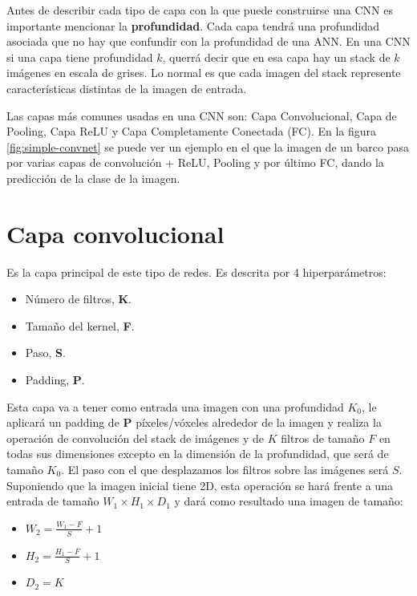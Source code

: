 Antes de describir cada tipo de capa con la que puede construirse una CNN es importante mencionar la \textbf{profundidad}. Cada capa tendrá una profundidad asociada que no hay que confundir con la profundidad de una ANN. En una CNN si una capa tiene profundidad $k$, querrá decir que en esa capa hay un stack de $k$ imágenes en escala de grises. Lo normal es que cada imagen del stack represente características distintas de la imagen de entrada.

Las capas más comunes usadas en una CNN son: Capa Convolucional, Capa de Pooling, Capa ReLU y Capa Completamente Conectada (FC). En la figura \ref{fig:simple-convnet} \cite{missinglink2020} se puede ver un ejemplo en el que la imagen de un barco pasa por varias capas de convolución + ReLU, Pooling y por último FC, dando la predicción de la clase de la imagen.


\newpage\section{Capa convolucional}

Es la capa principal de este tipo de redes. Es descrita por 4 hiperparámetros:

\begin{itemize}
\item Número de filtros, \textbf{K}.
\item Tamaño del kernel, \textbf{F}.
\item Paso, \textbf{S}.
\item Padding, \textbf{P}.
\end{itemize}

Esta capa va a tener como entrada una imagen con una profundidad $K_0$, le aplicará un padding de \textbf{P} píxeles/vóxeles alrededor de la imagen y realiza la operación de convolución del stack de imágenes y de $K$ filtros de tamaño $F$ en todas sus dimensiones excepto en la dimensión de la profundidad, que será de tamaño $K_0$. El paso con el que desplazamos los filtros sobre las imágenes será $S$. Suponiendo que la imagen inicial tiene 2D, esta operación se hará frente a una entrada de tamaño $W_1 \times H_1 \times D_1$ y dará como resultado una imagen de tamaño:

\begin{itemize}
\item $W_2 = \frac{W_1 - F}{S} + 1$
\item $H_2 = \frac{H_1 - F}{S} + 1$
\item $D_2 = K$
\end{itemize}

